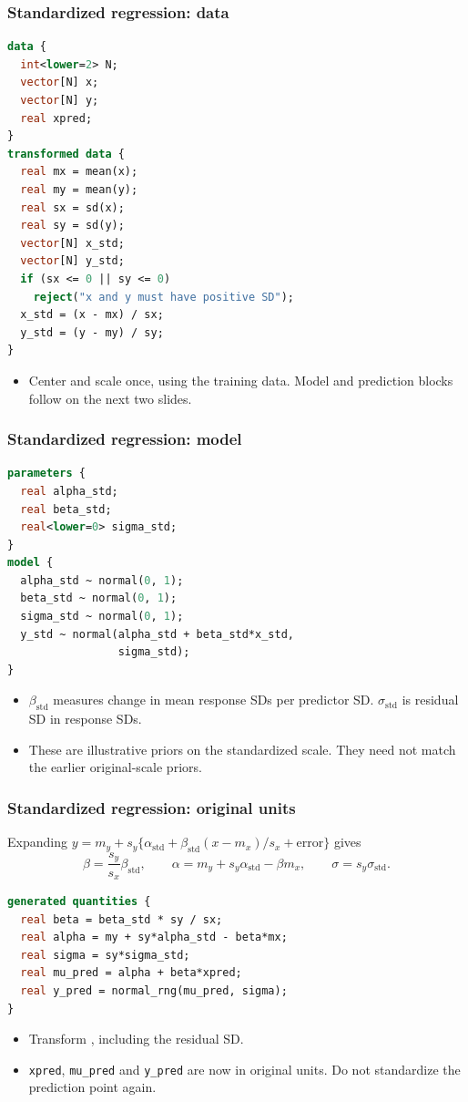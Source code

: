 \documentclass[10pt]{beamer}
\begin{document}
\begin{frame}[fragile]

\frametitle{Standardized regression: data}

  {\footnotesize
\begin{lstlisting}[language=Stan]
data {
  int<lower=2> N;
  vector[N] x;
  vector[N] y;
  real xpred;
}
transformed data {
  real mx = mean(x);
  real my = mean(y);
  real sx = sd(x);
  real sy = sd(y);
  vector[N] x_std;
  vector[N] y_std;
  if (sx <= 0 || sy <= 0)
    reject("x and y must have positive SD");
  x_std = (x - mx) / sx;
  y_std = (y - my) / sy;
}
\end{lstlisting}
  }
\begin{itemize}
\item Center and scale once, using the training data.
  Model and prediction blocks follow on the next two slides.
\end{itemize}
\end{frame}

\begin{frame}[fragile]
\frametitle{Standardized regression: model}

{\small
\begin{lstlisting}[language=Stan]
parameters {
  real alpha_std;
  real beta_std;
  real<lower=0> sigma_std;
}
model {
  alpha_std ~ normal(0, 1);
  beta_std ~ normal(0, 1);
  sigma_std ~ normal(0, 1);
  y_std ~ normal(alpha_std + beta_std*x_std,
                 sigma_std);
}
\end{lstlisting}
}
\begin{itemize}
\item $\beta_{\mathrm{std}}$ measures change in mean response SDs
  per predictor SD. $\sigma_{\mathrm{std}}$ is residual SD in response SDs.
\item These are illustrative priors on the standardized scale.
  They need not match the earlier original-scale priors.
\end{itemize}
\end{frame}

\begin{frame}[fragile]
\frametitle{Standardized regression: original units}

Expanding $y=m_y+s_y\{\alpha_{\mathrm{std}}
+\beta_{\mathrm{std}}(x-m_x)/s_x+\text{error}\}$ gives
\[
\beta=\frac{s_y}{s_x}\beta_{\mathrm{std}},\qquad
\alpha=m_y+s_y\alpha_{\mathrm{std}}-\beta m_x,\qquad
\sigma=s_y\sigma_{\mathrm{std}}.
\]
{\small
\begin{lstlisting}[language=Stan]
generated quantities {
  real beta = beta_std * sy / sx;
  real alpha = my + sy*alpha_std - beta*mx;
  real sigma = sy*sigma_std;
  real mu_pred = alpha + beta*xpred;
  real y_pred = normal_rng(mu_pred, sigma);
}
\end{lstlisting}
}
\begin{itemize}
\item Transform , including the residual SD.
\item \texttt{xpred}, \texttt{mu\_pred} and \texttt{y\_pred} are now
  in original units. Do not standardize the prediction point again.
\end{itemize}
\end{frame}
\end{document}
